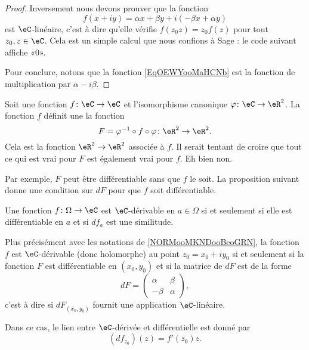 \begin{proof}
    Inversement nous devons prouver que la fonction 
    \begin{equation}        \label{EqOEWYooMaHCNb}
        f(x+iy)=\alpha x+\beta y+i(-\beta x+\alpha y)
    \end{equation}
    est \( \eC\)-linéaire, c'est à dire qu'elle vérifie \( f(z_0z)=z_0f(z)\) pour tout \( z_0,z\in \eC\). Cela est un simple calcul que nous confions à Sage : le code suivant affiche «\( 0\)».
    

    Pour conclure, notons que la fonction \eqref{EqOEWYooMaHCNb} est la fonction de multiplication par \( \alpha-i\beta\).
\end{proof}

\begin{normaltext}      \label{NORMooMKNDooBeoGRN}
    Soit une fonction \( f\colon \eC\to \eC\) et l'isomorphisme canonique \( \varphi\colon \eC\to \eR^2\). La fonction \( f\) définit une la fonction
    \begin{equation}
        F=\varphi^{-1} \circ f\circ \varphi\colon \eR^2\to \eR^2.
    \end{equation}
    Cela est la fonction \( \eR^2\to \eR^2\) associée à \( f\). Il serait tentant de croire que tout ce qui est vrai pour \( F\) est également vrai pour \( f\). Eh bien non.

    Par exemple, \( F\) peut être différentiable sans que \( f\) le soit. La proposition suivant donne une condition sur \( dF\) pour que \( f\) soit différentiable.
\end{normaltext}

\begin{proposition}     \label{PropKJUDooJfqgYS}
    Une fonction \( f\colon \Omega\to \eC\) est $\eC$-dérivable en \( a\in\Omega\) si et seulement si elle est différentiable en \( a\) et si \( df_a\) est une similitude.

    Plus précisément avec les notations de \ref{NORMooMKNDooBeoGRN}, la fonction \( f\) est $\eC$-dérivable (donc holomorphe) au point \( z_0=x_0+iy_0\) si et seulement si la fonction \( F\) est différentiable en \( (x_0,y_0)\) et si la matrice de \( dF\) est de la forme
    \begin{equation}        \label{EQooWZGKooLDEHGr}
        dF=\begin{pmatrix}
            \alpha    &   \beta    \\ 
            -\beta    &   \alpha    
        \end{pmatrix},
    \end{equation}
    c'est à dire si \( dF_{(x_0,y_0)}\) fournit une application \( \eC\)-linéaire.

    Dans ce cas, le lien entre \( \eC\)-dérivée et différentielle est donné par
    \begin{equation}        \label{EqPAEFooYNhYpz}
        (df_{z_0})(z)=f'(z_0)z.
    \end{equation}
\end{proposition}

